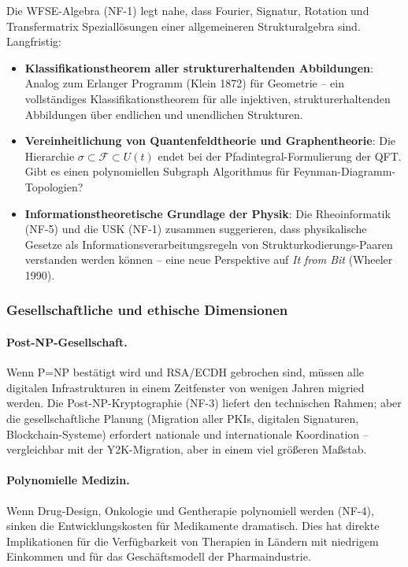 ﻿\documentclass[a4paper,12pt]{scrreprt}
\theoremstyle{definition}
\begin{document}
Die WFSE-Algebra (NF-1) legt nahe, dass Fourier, Signatur, Rotation
und Transfermatrix Speziallösungen einer allgemeineren Strukturalgebra
sind. Langfristig:
\begin{itemize}
  \item \textbf{Klassifikationstheorem aller strukturerhaltenden
    Abbildungen}: Analog zum Erlanger Programm (Klein 1872) für
    Geometrie -- ein vollständiges Klassifikationstheorem für alle
    injektiven, strukturerhaltenden Abbildungen über endlichen
    und unendlichen Strukturen.
  \item \textbf{Vereinheitlichung von Quantenfeldtheorie und
    Graphentheorie}: Die Hierarchie
    $\sigma \subset \mathcal{F} \subset U(t)$ endet bei der
    Pfadintegral-Formulierung der QFT. Gibt es einen
    polynomiellen Subgraph Algorithmus für
    Feynman-Diagramm-Topologien?
  \item \textbf{Informationstheoretische Grundlage der Physik}:
    Die Rheoinformatik (NF-5) und die USK (NF-1) zusammen suggerieren,
    dass physikalische Gesetze als Informationsverarbeitungsregeln
    von Strukturkodierungs-Paaren verstanden werden können --
    eine neue Perspektive auf \emph{It from Bit} (Wheeler 1990).
\end{itemize}

\subsubsection{Gesellschaftliche und ethische Dimensionen}

\paragraph{Post-NP-Gesellschaft.}
Wenn P=NP bestätigt wird und RSA/ECDH gebrochen sind, müssen alle
digitalen Infrastrukturen in einem Zeitfenster von wenigen Jahren
migried werden. Die Post-NP-Kryptographie (NF-3) liefert den
technischen Rahmen; aber die gesellschaftliche Planung (Migration
aller PKIs, digitalen Signaturen, Blockchain-Systeme) erfordert
nationale und internationale Koordination -- vergleichbar mit
der Y2K-Migration, aber in einem viel größeren Maßstab.

\paragraph{Polynomielle Medizin.}
Wenn Drug-Design, Onkologie und Gentherapie polynomiell werden (NF-4),
sinken die Entwicklungskosten für Medikamente dramatisch. Dies hat
direkte Implikationen für die Verfügbarkeit von Therapien
in Ländern mit niedrigem Einkommen und für das Geschäftsmodell
der Pharmaindustrie.
\end{document}
